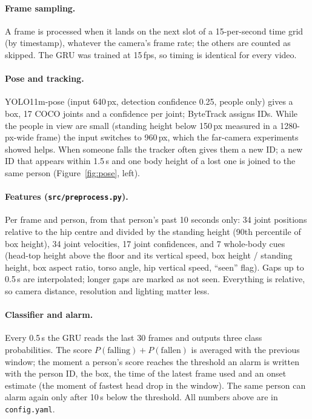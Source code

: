 \documentclass[11pt,a4paper]{article}
\newcommand{\code}[1]{\texttt{\small #1}}
\begin{document}
\paragraph{Frame sampling.} A frame is processed when it lands on the next slot of a 15-per-second time grid
(by timestamp), whatever the camera's frame rate; the others are counted as skipped. The GRU was trained at
15\,fps, so timing is identical for every video.

\paragraph{Pose and tracking.} YOLO11m-pose (input 640\,px, detection confidence 0.25, people only) gives a
box, 17 COCO joints and a confidence per joint; ByteTrack assigns IDs. While the people in view are small
(standing height below 150\,px measured in a 1280-px-wide frame) the input switches to 960\,px, which the
far-camera experiments showed helps. When someone falls the tracker often gives them a new ID; a new ID that
appears within 1.5\,s and one body height of a lost one is joined to the same person
(Figure~\ref{fig:pose}, left).

\paragraph{Features (\code{src/preprocess.py}).} Per frame and person, from that person's past 10 seconds
only: 34 joint positions relative to the hip centre and divided by the standing height (90th percentile of
box height), 34 joint velocities, 17 joint confidences, and 7 whole-body cues (head-top height above the floor
and its vertical speed, box height / standing height, box aspect ratio, torso angle, hip vertical speed,
``seen'' flag). Gaps up to 0.5\,s are interpolated; longer gaps are marked as not seen. Everything is
relative, so camera distance, resolution and lighting matter less.

\paragraph{Classifier and alarm.} Every 0.5\,s the GRU reads the last 30 frames and outputs three class
probabilities. The score $P(\text{falling})+P(\text{fallen})$ is averaged with the previous window; the moment
a person's score reaches the threshold an alarm is written with the person ID, the box, the time of the
latest frame used and an onset estimate (the moment of fastest head drop in the window). The same person can
alarm again only after 10\,s below the threshold. All numbers above are in \code{config.yaml}.
\end{document}
